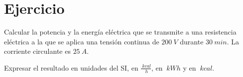 \section{Ejercicio}\label{ej:Chap01Ejercicio06}
Calcular la potencia y la energía eléctrica que se transmite a una resistencia eléctrica a la que se aplica una tensión continua de $\SI{200}{V}$ durante $\SI{30}{min}$. La corriente circulante es $\SI{25}{A}$. 

Expresar el resultado en unidades del SI, en $\frac{\SI{}{kcal}}{\SI{}{h}}$, en $\SI{}{kWh}$ y en $\SI{}{kcal}$.